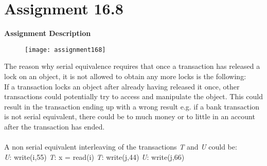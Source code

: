 \section{Assignment 16.8}
\textbf{Assignment Description}
\begin{figure}[H]
	\texttt{[image: assignment168]}
\end{figure}
The reason why serial equivalence requires that once a transaction has released a lock on an object, it is not allowed to obtain any more locks is the following:\\
If a transaction locks an object after already having released it once, other transactions could potentially try to access and manipulate the object. This could result in the transaction ending up with a wrong result e.g. if a bank transaction is not serial equivalent, there could be to much money or to little in an account after the transaction has ended.\\\\
A non serial equivalent interleaving of the transactions \textit{T} and \textit{U} could be:\\
\textit{U}: write(i,55)
\textit{T}: x = read(i)
\textit{T}: write(j,44)
\textit{U}: write(j,66)
